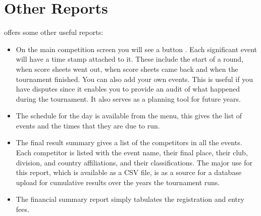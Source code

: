 \documentclass[a4paper,11pt]{memoir}
\begin{document}
\chapter{Other Reports}

\fencingtime{} offers some other useful reports:

\begin{itemize}
 \item On the main competition screen you will see a button . Each significant event will have a time stamp attached to it. These include the start of a round, when score sheets went out, when score sheets came back and when the tournament finished. You can also add your own events. This is useful if you have disputes since it enables you to provide an audit of what happened during the tournament. It also serves as a planning tool for future years.
 \item The schedule for the day is available from the  menu, this gives the list of events and the times that they are due to run.
 \item The final result summary gives a list of the competitors in all the events. Each \gls{competitor} is listed with the event name, their final place, their \gls{club}, division, and country affiliations, and their classifications. The major use for this report, which is available as a CSV file, is as a source for a database upload for cumulative results over the years the tournament runs.
 \item The financial summary report simply tabulates the registration and entry fees.
\end{itemize}


\printglossary
{}
\end{document}
